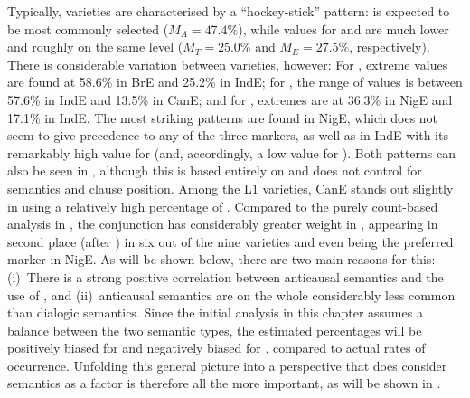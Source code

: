Typically, varieties are characterised by a “hockey-stick” pattern:  is expected to be most commonly selected ($M_A=47.4\%$), while values for  and  are much lower and roughly on the same level ($M_T=25.0\%$ and $M_E=27.5\%$, respectively). There is considerable variation between varieties, however: For , extreme values are found at 58.6\% in BrE and 25.2\% in IndE; for , the range of values is between 57.6\% in IndE and 13.5\% in CanE; and for , extremes are at 36.3\% in NigE and 17.1\% in IndE. The most striking patterns are found in NigE, which does not seem to give precedence to any of the three markers, as well as in IndE with its remarkably high value for  (and, accordingly, a low value for ). Both patterns can also be seen in , although this is based entirely on  and does not control for semantics and clause position. Among the L1 varieties, CanE stands out slightly in using a relatively high percentage of . Compared to the purely count-based analysis in , the conjunction  has considerably greater weight in , appearing in second place (after ) in six out of the nine varieties and even being the preferred marker in NigE. As will be shown below, there are two main reasons for this:
(i)~There is a strong positive correlation between anticausal semantics and the use of , and
(ii)~anticausal semantics are on the whole considerably less common than dialogic semantics. Since the initial analysis in this chapter assumes a balance between the two semantic types, the estimated percentages will be positively biased for  and negatively biased for , compared to actual rates of occurrence. Unfolding this general picture into a perspective that does consider semantics as a factor is therefore all the more important, as will be shown in .\largerpage

